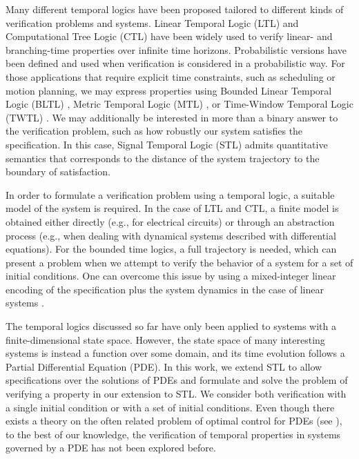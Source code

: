 \documentclass[oribibl]{llncs/llncs}
\begin{document}
Many different temporal logics have been proposed tailored to
different kinds of verification problems and systems. Linear Temporal Logic
(LTL) \cite{gerth_simple_1996} and Computational Tree Logic (CTL)
\cite{clarke_automatic_1986} have been widely used to verify
linear- and branching-time properties over infinite time horizons. Probabilistic
versions have been defined and used when verification is considered in a
probabilistic way. For those applications that require explicit time
constraints, such as scheduling or motion planning, we may express properties
using Bounded Linear Temporal Logic (BLTL) \cite{jha_bayesian_2009-1}, Metric
Temporal Logic (MTL) \cite{luo_using_2016}, 
or Time-Window Temporal Logic (TWTL) \cite{AkVaBe-ICRA-2016}. We may additionally be interested in more
than a binary answer to the verification problem, such as how robustly our
system satisfies the specification. In this case, Signal Temporal Logic (STL)
\cite{donze_robust_2010}
admits quantitative semantics that corresponds to the distance of the system
trajectory to the boundary of satisfaction.

In order to formulate a verification problem using a temporal logic, a suitable
model of the system is required. In the case of LTL and CTL, a finite model is
obtained either directly (e.g., for electrical circuits) or through
an abstraction process (e.g., when dealing with dynamical systems described with
differential equations). For the bounded time logics, a full trajectory is
needed, which can present a problem when we attempt to verify the behavior of a
system for a set of initial conditions. One can overcome this issue by using 
a mixed-integer linear encoding of the specification plus the system dynamics in
the case of linear systems \cite{sadraddini_robust_2015}.

The temporal logics discussed so far have only been applied to systems with a
finite-dimensional state space. However, the state space of many interesting systems
is instead a function over some domain, and its time evolution
follows a Partial Differential Equation (PDE). In this work, we extend STL to allow
specifications over the solutions of PDEs and formulate and solve the problem 
of verifying a property in our extension to STL. We consider both verification
with a single initial condition or with a set of initial conditions.
Even though there exists a theory on the often related problem of optimal
control for PDEs (see \cite{lions_optimal_1971}), to the best of our knowledge, the verification 
of temporal properties in systems governed by a PDE has not been explored before.
\end{document}
